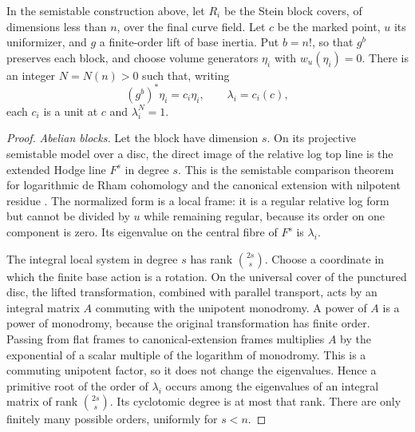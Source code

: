 \begin{lemma}\label{lem:den-characters}
In the semistable construction above, let $R_i$ be the Stein block
covers, of dimensions less than $n$, over the final curve field.
Let $c$ be the marked point, $u$ its uniformizer, and $g$ a
finite-order lift of base inertia. Put $b=n!$, so that $g^b$
preserves each block, and choose volume generators $\eta_i$ with
$w_u(\eta_i)=0$. There is an integer $N=N(n)>0$ such that, writing
\[
 (g^b)^*\eta_i=c_i\eta_i,
 \qquad \lambda_i=c_i(c),
\]
each $c_i$ is a unit at $c$ and $\lambda_i^N=1$.
\end{lemma}

\begin{proof}
\smallskip\noindent\textit{Abelian blocks.}
Let the block have dimension $s$.  On its projective semistable
model over a disc, the direct image of the relative log top line is
the extended Hodge line $F^s$ in degree $s$.  This is the semistable
comparison theorem for logarithmic de Rham cohomology and the
canonical extension with nilpotent residue
\cite{Deligne1970,Steenbrink1976}.  The normalized form is a local
frame: it is a regular relative log form but cannot be divided by
$u$ while remaining regular, because its order on one component is
zero.  Its eigenvalue on the central fibre of $F^s$ is $\lambda_i$.

The integral local system in degree $s$ has rank
$\binom{2s}{s}$.  Choose a coordinate in which the finite base
action is a rotation.  On the universal cover of the punctured disc,
the lifted transformation, combined with parallel transport, acts
by an integral matrix $A$ commuting with the unipotent monodromy.
A power of $A$ is a power of monodromy, because the original
transformation has finite order.  Passing from flat frames to
canonical-extension frames multiplies $A$ by the exponential of a
scalar multiple of the logarithm of monodromy.  This is a commuting
unipotent factor, so it does not change the eigenvalues.  Hence a
primitive root of the order of $\lambda_i$ occurs among the
eigenvalues of an integral matrix of rank $\binom{2s}{s}$.  Its
cyclotomic degree is at most that rank.  There are only finitely many
possible orders, uniformly for $s<n$.


\end{proof}
